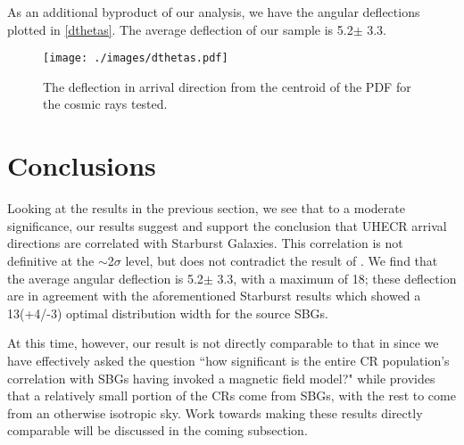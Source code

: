 As an additional byproduct of our analysis, we have the angular deflections plotted in \autoref{dthetas}. The average deflection of our sample is 5.2\degree $\pm$ 3.3\degree. 
\begin{figure}[H]
\centering
\texttt{[image: ./images/dthetas.pdf]}
\caption[Angular Direction Change]{The deflection in arrival direction from the centroid of the PDF for the cosmic rays tested.}
\label{dthetas}
\end{figure}

\section{Conclusions}
Looking at the results in the previous section, we see that to a moderate significance, our results suggest and support the conclusion that UHECR arrival directions are correlated with Starburst Galaxies. This correlation is not definitive at the $\sim$2$\sigma$ level, but does not contradict the result of . We find that the average angular deflection is 5.2\degree $\pm$ 3.3\degree, with a maximum of 18\degree; these deflection are in agreement with the aforementioned Starburst results which showed a 13\degree  (+4\degree/-3\degree) optimal distribution width for the source SBGs. 

At this time, however, our result is not directly comparable to that in \textcite{starburst} since we have effectively asked the question ``how significant is the entire CR population's correlation with SBGs having invoked a magnetic field model?" while  provides that a relatively small portion of the CRs come from SBGs, with the rest to come from an otherwise isotropic sky. Work towards making these results directly comparable will be discussed in the coming subsection.
